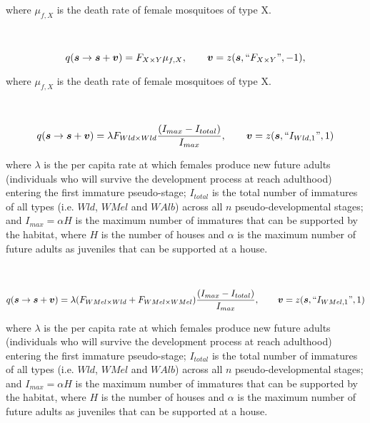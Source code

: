 \documentclass[]{article}  %
\begin{document}
\noindent where $\mu_{f, X}$ is the death rate of female mosquitoes of type X.
\\
\\
\\
$$q(\boldsymbol{s} \rightarrow \boldsymbol{s} + \boldsymbol{v}) = F_{X \times Y} \mu_{f, X}, \qquad \boldsymbol{v} =  z(\boldsymbol{s}, \textup{``} F_{X \times Y} \textup{''} , -1),$$

\noindent where $\mu_{f,X}$ is the death rate of female mosquitoes of type X.
\\
\\
\\
$$q(\boldsymbol{s} \rightarrow \boldsymbol{s} + \boldsymbol{v}) = \lambda F_{Wld \times Wld}\frac{(I_{max} - I_{total})}{I_{max}},  \qquad \boldsymbol{v} =  z(\boldsymbol{s}, \textup{``} I_{Wld, 1} \textup{''} , 1)$$

\noindent where $\lambda$ is the per capita rate at which females produce new future adults (individuals who will survive the development process at reach adulthood) entering the first immature pseudo-stage; $I_{total}$ is the total number of immatures of all types (i.e. $Wld$, $WMel$ and $WAlb$) across all $n$ pseudo-developmental stages; and $I_{max} = \alpha H$ is the maximum number of immatures that can be supported by the habitat, where $H$ is the number of houses and $\alpha$ is the maximum number of future adults as juveniles that can be supported at a house.
\\
\\
\\
$$q(\boldsymbol{s} \rightarrow \boldsymbol{s} + \boldsymbol{v}) = \lambda (F_{WMel \times Wld} + F_{WMel \times WMel})\frac{(I_{max} - I_{total})}{I_{max}},  \qquad \boldsymbol{v} =  z(\boldsymbol{s}, \textup{``} I_{WMel, 1} \textup{''} , 1)$$

\noindent where $\lambda$ is the per capita rate at which females produce new future adults (individuals who will survive the development process at reach adulthood) entering the first immature pseudo-stage; $I_{total}$ is the total number of immatures of all types (i.e. $Wld$, $WMel$ and $WAlb$) across all $n$ pseudo-developmental stages; and $I_{max} = \alpha H$ is the maximum number of immatures that can be supported by the habitat, where $H$ is the number of houses and $\alpha$ is the maximum number of future adults as juveniles that can be supported at a house.
\\
\\
\\
\end{document}
